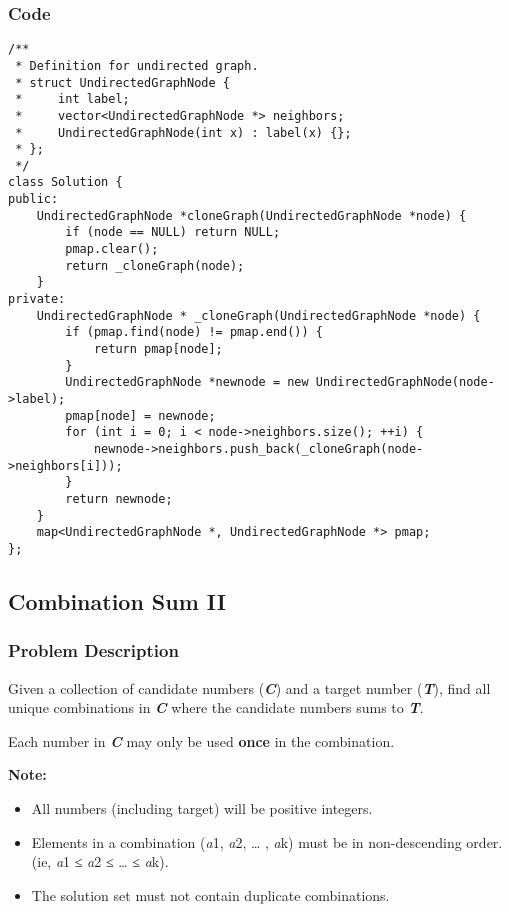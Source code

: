 \documentclass[courier]{article}
\begin{document}
\begin{CJK*}{UTF8}{gkai}
\subsubsection*{Code}
\begin{lstlisting}
/**
 * Definition for undirected graph.
 * struct UndirectedGraphNode {
 *     int label;
 *     vector<UndirectedGraphNode *> neighbors;
 *     UndirectedGraphNode(int x) : label(x) {};
 * };
 */
class Solution {
public:
    UndirectedGraphNode *cloneGraph(UndirectedGraphNode *node) {
        if (node == NULL) return NULL;
        pmap.clear();
        return _cloneGraph(node);
    }
private:
    UndirectedGraphNode * _cloneGraph(UndirectedGraphNode *node) {
        if (pmap.find(node) != pmap.end()) {
            return pmap[node];
        }
        UndirectedGraphNode *newnode = new UndirectedGraphNode(node->label);
        pmap[node] = newnode;
        for (int i = 0; i < node->neighbors.size(); ++i) {
            newnode->neighbors.push_back(_cloneGraph(node->neighbors[i]));
        }
        return newnode;
    }
    map<UndirectedGraphNode *, UndirectedGraphNode *> pmap;
}; 
\end{lstlisting}


\subsection{ Combination Sum II }

\subsubsection*{Problem Description}
Given a collection of candidate numbers (\textbf{\emph{C}}) and a target number (\textbf{\emph{T}}), find all unique combinations in \textbf{\emph{C}} where the candidate numbers sums to \textbf{\emph{T}}.

Each number in \textbf{\emph{C}} may only be used \textbf{once} in the combination.

\textbf{Note:}



\begin{itemize}
\item All numbers (including target) will be positive integers.
\item Elements in a combination (\emph{a}1, \emph{a}2, … , \emph{a}k) must be in non-descending order. (ie, \emph{a}1 ≤ \emph{a}2 ≤ … ≤ \emph{a}k).
\item The solution set must not contain duplicate combinations.
\end{itemize}


\end{CJK*}
\end{document}
